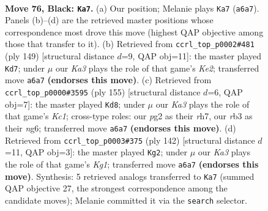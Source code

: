 \documentclass[11pt]{article}
\begin{document}
\clearpage

\begin{figure}[p]\centering
\begin{subfigure}{0.46\textwidth}\centering
\resizebox{\linewidth}{!}{%
\newchessgame
\chessboard[
  setfen={8/8/k7/8/8/1R1N2K1/6P1/3r4 b - - 17 76},
  showmover=false,
  pgfstyle=straightmove, color=movearrow, markmove={a6-a7}
]}
\caption{}
\end{subfigure}\hfill
\begin{subfigure}{0.46\textwidth}\centering
\resizebox{\linewidth}{!}{%
\newchessgame
\chessboard[
  setfen={8/4k3/2R5/4p3/6K1/8/1rN5/8 b - - 0 75},
  showmover=false,
  pgfstyle=straightmove, color=movearrow, markmove={e7-d7}
]}
\caption{}
\end{subfigure}
\\[4pt]
\begin{subfigure}{0.46\textwidth}\centering
\resizebox{\linewidth}{!}{%
\newchessgame
\chessboard[
  setfen={2k5/7R/6N1/7K/5P2/8/5r2/8 b - - 0 78},
  showmover=false,
  pgfstyle=straightmove, color=movearrow, markmove={c8-d8}
]}
\caption{}
\end{subfigure}\hfill
\begin{subfigure}{0.46\textwidth}\centering
\resizebox{\linewidth}{!}{%
\newchessgame
\chessboard[
  setfen={8/8/8/6p1/6k1/4R3/8/1r4K1 w - - 28 72},
  showmover=false,
  pgfstyle=straightmove, color=movearrow, markmove={g1-g2}
]}
\caption{}
\end{subfigure}
\caption{\textbf{Move 76, Black: \texttt{Ka7}.} (a) Our position; Melanie plays \texttt{Ka7} (\texttt{a6a7}). Panels (b)--(d) are the retrieved master positions whose correspondence most drove this move (highest QAP objective among those that transfer to it). (b) Retrieved from \texttt{ccrl\_top\_p0002\#481} (ply 149) [structural distance $d$=9, QAP obj=11]: the master played \texttt{Kd7}; under $\mu$ our \emph{Ka3} plays the role of that game's \emph{Ke2}; transferred move \texttt{a6a7} \textbf{(endorses this move)}. (c) Retrieved from \texttt{ccrl\_top\_p0000\#3595} (ply 155) [structural distance $d$=6, QAP obj=7]: the master played \texttt{Kd8}; under $\mu$ our \emph{Ka3} plays the role of that game's \emph{Kc1}; cross-type roles: our \emph{p}g2 as their \emph{r}h7, our \emph{r}b3 as their \emph{n}g6; transferred move \texttt{a6a7} \textbf{(endorses this move)}. (d) Retrieved from \texttt{ccrl\_top\_p0003\#375} (ply 142) [structural distance $d$=11, QAP obj=3]: the master played \texttt{Kg2}; under $\mu$ our \emph{Ka3} plays the role of that game's \emph{Kg1}; transferred move \texttt{a6a7} \textbf{(endorses this move)}. Synthesis: 5 retrieved analogs transferred to \texttt{Ka7} (summed QAP objective 27, the strongest correspondence among the candidate moves); Melanie committed it via the \texttt{search} selector.}
\label{fig:thought-m151}
\end{figure}
\end{document}
